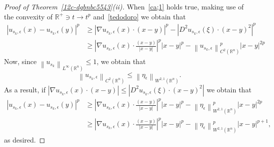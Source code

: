 \documentclass[12pt]{article}
\newcommand{\R}{\mathbb{R}}
\numberwithin{equation}{section}
\renewcommand{\leq}{\leqslant}
\renewcommand{\geq}{\geqslant}
\begin{document}
\begin{proof}[Proof of Theorem~\ref{12c-dgbnbc5543}(ii)]
When~\eqref{ca;1} holds true, making use of the convexity of $\R^+\ni t \to t^p$ and~\eqref{tedodoro} we obtain that 
\begin{equation*}
\begin{split}
\left|u_{s_k,\epsilon}(x)-u_{s_k,\epsilon}(y)\right|^p &\geq \left|\nabla u_{s_k,\epsilon} (x) \cdot(x-y)\right|^p-\left|D^2u_{s_k,\epsilon}(\xi)\cdot(x-y)^2 \right|^p\\
&\geq \left|\nabla u_{s_k,\epsilon} (x) \cdot\frac{(x-y)}{\left|x-y\right|}\right|^p\left|x-y\right|^p-\left\|u_{s_k,\epsilon}\right\|_{C^2(\R^n)}^p\left|x-y\right|^{2p}
\end{split}
\end{equation*}
Now, since $\left\|u_{s_k}\right\|_{L^\infty(\R^n)}\leq 1$, we obtain that 
\begin{equation}\label{ohgbrelmvdfre36}
\left\|u_{s_k,\epsilon}\right\|_{C^2(\R^n)}\leq \left\|\eta_\epsilon \right\|_{W^{2,1}(\R^n)}.
\end{equation} 
As a result, if $\left|\nabla u_{s_k,\epsilon} (x) \cdot(x-y)\right|\leq \left|D^2u_{s_k,\epsilon}(\xi)\cdot(x-y)^2 \right|$ we obtain that
\begin{equation}\label{Euno1}
\begin{split}
\left|u_{s_k,\epsilon}(x)-u_{s_k,\epsilon}(y)\right|^p &\geq \left|\nabla u_{s_k,\epsilon} (x) \cdot\frac{(x-y)}{\left|x-y\right|}\right|^p\left|x-y\right|^p-\left\|\eta_\epsilon\right\|_{W^{2,1}(\R^n)}^p\left|x-y\right|^{2p}\\
&\geq \left|\nabla u_{s_k,\epsilon} (x) \cdot\frac{(x-y)}{\left|x-y\right|}\right|^p\left|x-y\right|^p-\left\|\eta_\epsilon\right\|_{W^{2,1}(\R^n)}^p\left|x-y\right|^{p+1},
\end{split}
\end{equation}as desired.


\end{proof}
\end{document}
